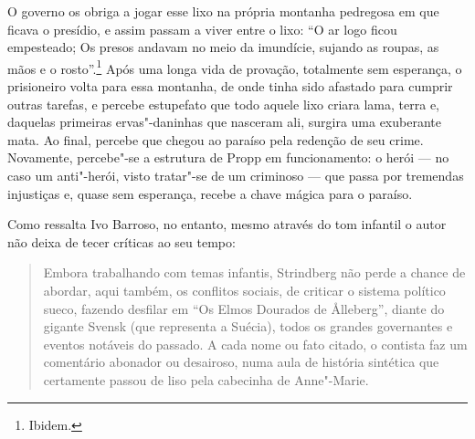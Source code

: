 O governo os obriga a jogar esse lixo na própria montanha pedregosa em que ficava o presídio, e assim passam a viver entre o lixo: ``O ar logo
ficou empesteado; Os presos andavam no meio da imundície, sujando as
roupas, as mãos e o rosto''.\footnote{Ibidem.} Após uma longa vida de provação, totalmente sem esperança, o prisioneiro volta para essa montanha, de onde tinha sido afastado para cumprir outras tarefas, e percebe estupefato que todo aquele lixo criara lama, terra e, daquelas primeiras ervas"-daninhas que nasceram ali,  surgira uma exuberante mata. Ao final, percebe que chegou ao paraíso pela redenção de seu crime. Novamente, percebe"-se a estrutura de Propp em funcionamento: o herói --- no caso um anti"-herói, visto tratar"-se de um criminoso --- que passa por tremendas injustiças e, quase sem esperança, recebe a chave mágica para o paraíso.

Como ressalta Ivo Barroso, no entanto, mesmo através do tom infantil o autor não deixa de tecer críticas ao seu tempo:

\begin{quote}
Embora trabalhando com temas infantis, Strindberg não perde a chance de 
abordar, aqui também, os conflitos sociais, de criticar o sistema
político sueco, fazendo desfilar em ``Os Elmos Dourados de
\r Alleberg'', diante do gigante Svensk (que representa a Suécia), todos os
grandes governantes e eventos notáveis do passado. A cada nome ou fato
citado, o contista faz um comentário abonador ou desairoso, numa aula
de história sintética que certamente passou de liso pela cabecinha de
Anne"-Marie.
\end{quote}